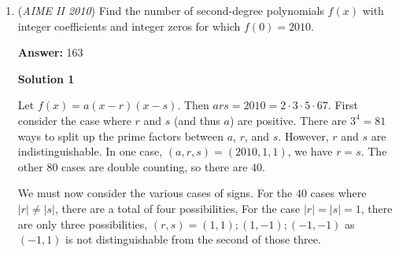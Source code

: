 \begin{enumerate}
 Finally,

 
 \begin{align*}&\sqrt{x^2+y^2}=OM=\frac{1}{7}\sqrt{1^2+(3\sqrt{3})^2}=\frac{1}{7}\sqrt{28}=\frac{2}{\sqrt{7}} \\ &\frac{\text{Area of smaller hexagon}}{\text{Area of bigger hexagon}}=\left(\frac{OM}{OA}\right)^2=\left(\frac{2}{\sqrt{7}}\right)^2=\frac{4}{7}\end{align*}


 Thus, the answer is $\boxed{011}$.

 
Diagram (by dragoon)\href{https://services.artofproblemsolving.com/download.php?id=YXR0YWNobWVudHMvZC82L2ZiNDljZmZiNjUzYWE4NGRmNmIwYTljMWQxZDU2ZDc1ZmNiMDQ3LmpwZWc=&rn=RDQ3ODA2RjUtMzlDNi00QzQ3LUE2OTYtMjlCQkE4NThDNkRBLmpwZWc=}{https://services.artofproblemsolving.com/download.php?id=YXR0YWNobWVudHMvZC82L2ZiNDljZmZiNjUzYWE4NGRmNmIwYTljMWQxZDU2ZDc1ZmNiMDQ3LmpwZWc=&rn=RDQ3ODA2RjUtMzlDNi00QzQ3LUE2OTYtMjlCQkE4NThDNkRBLmpwZWc=}

 



\textbf{Solution 3}

Use the diagram. Now notice that all of the "overlapping triangles" are congruent. You can use the AA similarity to see that the small triangles are similar to the large triangles. Now you can proceed as in Solution 1.

 


	\item (\textit{AIME II 2010}) Find the number of second-degree polynomials $f(x)$ with integer coefficients and integer zeros for which $f(0)=2010$.


 
 \textbf{Answer: }163



\textbf{Solution 1}

Let $f(x) = a(x-r)(x-s)$. Then $ars=2010=2\cdot3\cdot5\cdot67$. First consider the case where $r$ and $s$ (and thus $a$) are positive. There are $3^4 = 81$ ways to split up the prime factors between $a$, $r$, and $s$. However, $r$ and $s$ are indistinguishable. In one case, $(a,r,s) = (2010,1,1)$, we have $r=s$. The other $80$ cases are double counting, so there are $40$.

 We must now consider the various cases of signs. For the $40$ cases where $|r|\neq |s|$, there are a total of four possibilities, For the case $|r|=|s|=1$, there are only three possibilities, $(r,s) = (1,1); (1,-1); (-1,-1)$ as $(-1,1)$ is not distinguishable from the second of those three.


\end{enumerate}
